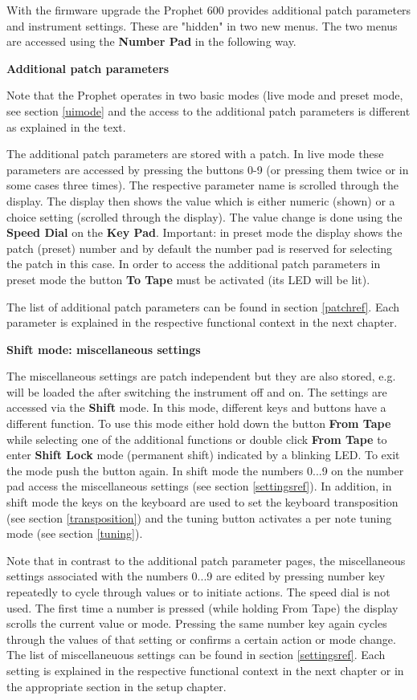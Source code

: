 \documentclass[draft,landscape, 11pt, oneside]{report}
\newenvironment{flowtext}{\addmargin[0cm]{7cm}}{\endaddmargin} %
\begin{document}
\begin{flowtext}
With the firmware upgrade the Prophet 600 provides additional patch parameters and instrument settings. These are "hidden" in two new menus. The two menus are accessed using the \textbf{Number Pad} in the following way. 

\textbf{Additional patch parameters}

Note that the Prophet operates in two basic modes (live mode and preset mode, see section \ref{uimode} and the access to the additional patch parameters is different as explained in the text.

The additional patch parameters are stored with a patch. In live mode these parameters are accessed by pressing the buttons 0-9 (or pressing them twice or in some cases three times). The respective parameter name is scrolled through the display. The display then shows the value which is either numeric (shown) or a choice setting (scrolled through the display). The value change is done using the \textbf{Speed Dial} on the \textbf{Key Pad}. Important: in preset mode the display shows the patch (preset) number and by default the number pad is reserved for selecting the patch in this case. In order to access the additional patch parameters in preset mode the button \textbf{To Tape} must be activated (its LED will be lit).
       
The list of additional patch parameters can be found in section \ref{patchref}. Each parameter is explained in the respective functional context in the next chapter.

\textbf{Shift mode: miscellaneous settings}

The miscellaneous settings are patch independent but they are also stored, e.g. will be loaded the after switching the instrument off and on. The settings are accessed via the \textbf{Shift} mode. In this mode, different keys and buttons have a different function. To use this mode either hold down the button \textbf{From Tape} while selecting one of the additional functions or double click \textbf{From Tape} to enter \textbf{Shift Lock} mode (permanent shift) indicated by a blinking LED. To exit the mode push the button again. In shift mode the numbers 0...9 on the number pad access the miscellaneous settings (see section \ref{settingsref}). In addition, in shift mode the keys on the keyboard are used to set the keyboard transposition (see section \ref{transposition}) and the tuning button activates a per note tuning mode (see section \ref{tuning}).

Note that in contrast to the additional patch parameter pages, the miscellaneous settings associated with the numbers 0...9 are edited by pressing number key repeatedly to cycle through values or to initiate actions. The speed dial is not used. The first time a number is pressed (while holding From Tape) the display scrolls the current value or mode. Pressing the same number key again cycles through the values of that setting or confirms a certain action or mode change. The list of miscellaneuous settings can be found in section \ref{settingsref}. Each setting is explained in the respective functional context in the next chapter or in the appropriate section in the setup chapter.


\end{flowtext}
\end{document}
